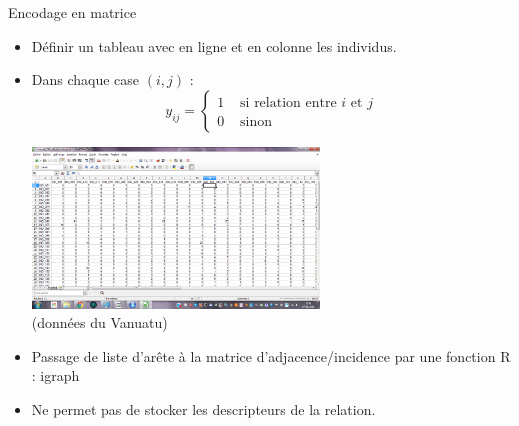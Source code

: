 \documentclass[compress,10pt]{beamer}
\begin{document}
\begin{frame}{Encodage en matrice}
\begin{itemize}
\item Définir un tableau avec en ligne et en colonne les individus. 
\item Dans chaque case $(i,j)$ : 
$$y_{ij} =
\left\{ 
\begin{array}{cl} 1&  \mbox{ si relation entre $i$ et $j$}\\

 0 & \mbox{ sinon}
 \end{array}
 \right.$$ 
 
{ \centering
\includegraphics[width =  0.6\textwidth]{plots/ecran_data_vanuatu.png}\\
}
(données du Vanuatu)
\item Passage de liste d'arête à la matrice d'adjacence/incidence par une fonction \textsf{R} : \textsf{igraph}
\item Ne permet pas de stocker les descripteurs de la relation. 
\end{itemize}
\end{frame}
\end{document}
